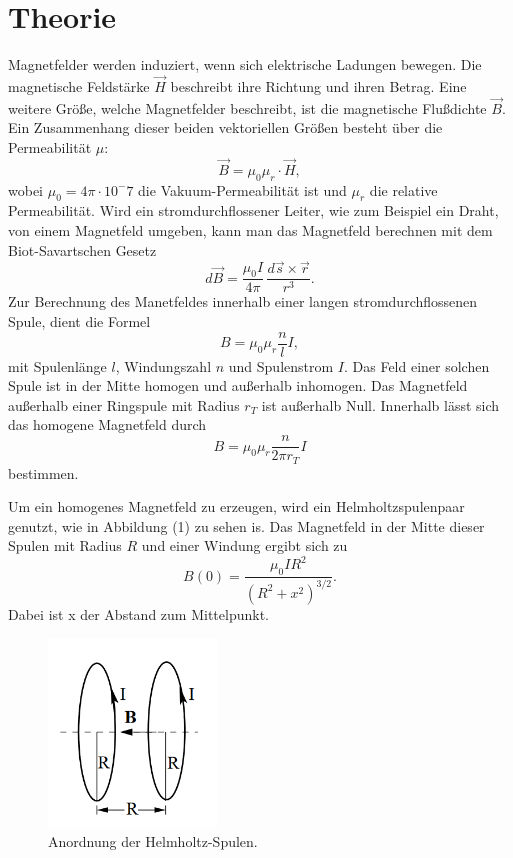 \section{Theorie}
\label{sec:Theorie}

Magnetfelder werden induziert, wenn sich elektrische Ladungen bewegen. Die magnetische Feldstärke $\vec{H}$ beschreibt ihre Richtung und ihren Betrag.
Eine weitere Größe, welche Magnetfelder beschreibt, ist die magnetische Flußdichte $\vec{B}$. Ein Zusammenhang dieser beiden vektoriellen Größen besteht über die Permeabilität $\mu$:
\begin{equation*}
    \vec{B} = \mu_0 \mu_r \cdot \vec{H} ,
\end{equation*}
wobei $\mu_0 = 4\pi \cdot 10^-7$ die Vakuum-Permeabilität ist und $\mu_r$ die relative Permeabilität.
Wird ein stromdurchflossener Leiter, wie zum Beispiel ein Draht, von einem Magnetfeld umgeben, kann man das Magnetfeld berechnen mit dem Biot-Savartschen Gesetz
\begin{equation*}
    d\vec{B} =  \frac{\mu_\text{0}I}{4\pi}\,\frac{d\vec{s}\times\vec{r}}{r^3} .
\end{equation*}
Zur Berechnung des Manetfeldes innerhalb einer langen stromdurchflossenen Spule, dient die Formel
\begin{equation}
   B = \mu_0 \mu_r \frac{n}{l} I ,
\end{equation}
mit Spulenlänge $l$, Windungszahl $n$ und Spulenstrom $I$.
Das Feld einer solchen Spule ist in der Mitte homogen und außerhalb inhomogen.
Das Magnetfeld außerhalb einer Ringspule mit Radius $r_T$ ist außerhalb Null. Innerhalb lässt sich das homogene Magnetfeld durch
\begin{equation}
   B = \mu_0 \mu_r \frac{n}{2\pi r_T} I 
\end{equation}
bestimmen.

\noindent Um ein homogenes Magnetfeld zu erzeugen, wird ein Helmholtzspulenpaar genutzt, wie in Abbildung (1) zu sehen is.
Das Magnetfeld in der Mitte dieser Spulen mit Radius $R$ und einer Windung ergibt sich zu
\begin{equation}
   B(0) = \frac{\mu_\text{0}IR^2}{(R^2+x^2)^{3/2}} .
\end{equation}
Dabei ist x der Abstand zum Mittelpunkt.
\begin{figure}[H]
  \centering
  \includegraphics[height=5cm]{Screenshot (2)}
  \caption{Anordnung der Helmholtz-Spulen. \cite[S. 2]{sample}}
\end{figure}

